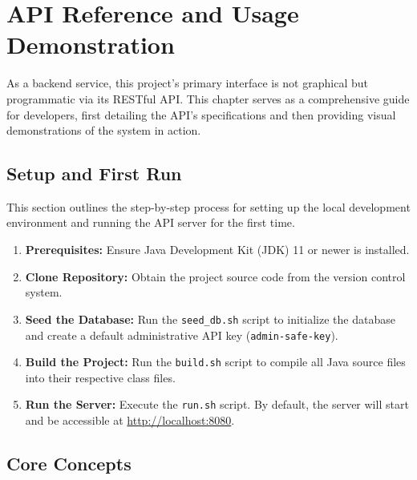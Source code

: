 \documentclass[12pt, a4paper]{report}
\begin{document}
\clearpage

\chapter{API Reference and Usage Demonstration}
\label{chap:api_reference}

As a backend service, this project's primary interface is not graphical but programmatic via its RESTful API. This chapter serves as a comprehensive guide for developers, first detailing the API's specifications and then providing visual demonstrations of the system in action.

\section{Setup and First Run}
This section outlines the step-by-step process for setting up the local development environment and running the API server for the first time.

\begin{enumerate}
    \item \textbf{Prerequisites:} Ensure Java Development Kit (JDK) 11 or newer is installed.
    
    \item \textbf{Clone Repository:} Obtain the project source code from the version control system.
    
    \item \textbf{Seed the Database:} Run the \lstinline|seed_db.sh| script to initialize the database and create a default administrative API key (\lstinline|admin-safe-key|).
    
    \item \textbf{Build the Project:} Run the \lstinline|build.sh| script to compile all Java source files into their respective class files.
    
    \item \textbf{Run the Server:} Execute the \lstinline|run.sh| script. By default, the server will start and be accessible at \url{http://localhost:8080}.
\end{enumerate}

\section{Core Concepts}
\end{document}
